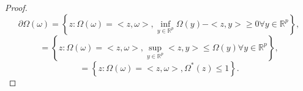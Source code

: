 \documentclass[12pt,draftcls, onecolumn, letterpaper,compsoc]{IEEEtran}
\begin{document}
\begin{proof}
    \begin{displaymath}
        \partial\Omega(\omega) = \left\lbrace z : \Omega(\omega) = <z,\omega>, \inf_{y\in\mathbb{R}^{p}} \Omega(y) -<z, y> \geq 0 \forall y\in\mathbb{R}^{p}\right\rbrace,
    \end{displaymath}
    \begin{displaymath}
        = \left\lbrace z : \Omega(\omega) = <z,\omega>, \sup_{y\in\mathbb{R}^{p}} <z, y>  \leq \Omega(y) \forall y\in\mathbb{R}^{p}\right\rbrace,
    \end{displaymath}
    \begin{displaymath}
        = \left\lbrace z : \Omega(\omega) = <z,\omega>, \Omega^{*}(z) \leq 1\right\rbrace.
    \end{displaymath}
\end{proof}
\end{document}
